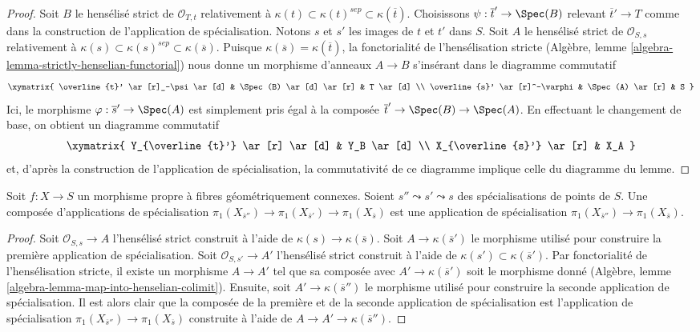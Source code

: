 \begin{proof}
Soit $B$ le hensélisé strict de $\mathcal{O}_{T, t}$ relativement à
$\kappa(t) \subset \kappa(t)^{sep} \subset \kappa(\overline{t})$.
Choisissons $\psi : \overline{t}' \to \Spec(B)$ relevant $\overline{t}' \to T$
comme dans la construction de l'application de spécialisation.
Notons $s$ et $s'$ les images de $t$ et $t'$ dans $S$.
Soit $A$ le hensélisé strict de $\mathcal{O}_{S, s}$
relativement à
$\kappa(s) \subset \kappa(s)^{sep} \subset \kappa(\overline{s})$.
Puisque $\kappa(\overline{s}) = \kappa(\overline{t})$,
la fonctorialité de l'hensélisation stricte
(Algèbre, lemme \ref{algebra-lemma-strictly-henselian-functorial})
nous donne un morphisme d'anneaux $A \to B$ s'insérant dans le diagramme commutatif
$$
\xymatrix{
\overline{t}' \ar[r]_-\psi \ar[d] & \Spec(B) \ar[d] \ar[r] & T \ar[d] \\
\overline{s}' \ar[r]^-\varphi & \Spec(A) \ar[r] & S
}
$$
Ici, le morphisme $\varphi : \overline{s}' \to \Spec(A)$ est simplement pris
égal à la composée $\overline{t}' \to \Spec(B) \to \Spec(A)$.
En effectuant le changement de base, on obtient un diagramme commutatif
$$
\xymatrix{
Y_{\overline{t}'} \ar[r] \ar[d] & Y_B \ar[d] \\
X_{\overline{s}'} \ar[r] & X_A
}
$$
et, d'après la construction de l'application de spécialisation, la commutativité
de ce diagramme implique celle du diagramme du lemme.
\end{proof}

\begin{lemma}
\label{lemma-specialization-map-composition}
Soit $f : X \to S$ un morphisme propre à fibres géométriquement connexes.
Soient $s'' \leadsto s' \leadsto s$ des spécialisations de points de $S$.
Une composée d'applications de spécialisation
$\pi_1(X_{\overline{s}''}) \to \pi_1(X_{\overline{s}'}) \to
\pi_1(X_{\overline{s}})$ est une application de spécialisation
$\pi_1(X_{\overline{s}''}) \to \pi_1(X_{\overline{s}})$.
\end{lemma}

\begin{proof}
Soit $\mathcal{O}_{S, s} \to A$ l'hensélisé strict
construit à l'aide de $\kappa(s) \to \kappa(\overline{s})$.
Soit $A \to \kappa(\overline{s}')$ le morphisme utilisé pour construire
la première application de spécialisation. Soit $\mathcal{O}_{S, s'} \to A'$
l'hensélisé strict construit à l'aide de
$\kappa(s') \subset \kappa(\overline{s}')$.
Par fonctorialité de l'hensélisation stricte, il existe un morphisme
$A \to A'$ tel que sa composée avec $A' \to \kappa(\overline{s}')$
soit le morphisme donné
(Algèbre, lemme \ref{algebra-lemma-map-into-henselian-colimit}).
Ensuite, soit $A' \to \kappa(\overline{s}'')$ le morphisme utilisé pour
construire la seconde application de spécialisation. Il est alors clair que
la composée de la première et de la seconde application de spécialisation
est l'application de spécialisation
$\pi_1(X_{\overline{s}''}) \to \pi_1(X_{\overline{s}})$
construite à l'aide de $A \to A' \to \kappa(\overline{s}'')$.
\end{proof}

